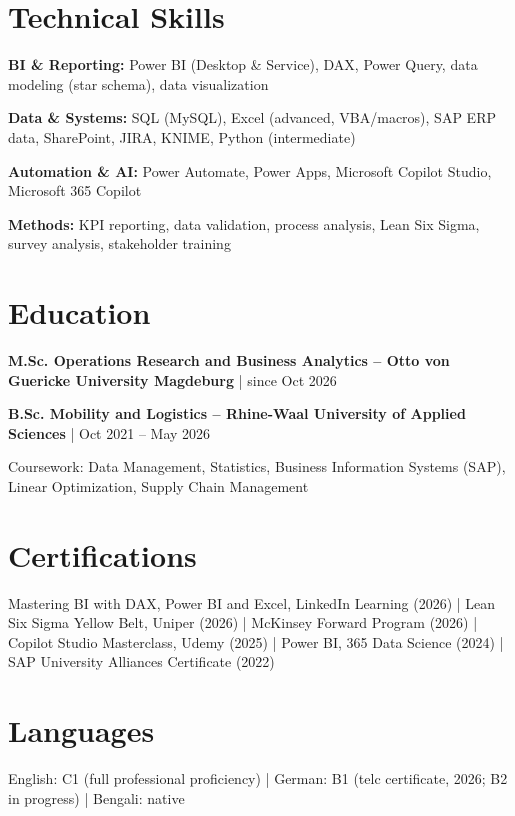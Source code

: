 \documentclass[10pt,a4paper]{article}
\newcommand{\entry}[2]{%
  \vspace{0.22em}%
  {\bfseries #1} | {\color{muted}#2}\par}
\newcommand{\skill}[2]{{\bfseries #1:} #2\par\vspace{0.12em}}
\begin{document}
\section{Technical Skills}
\skill{BI \& Reporting}{Power BI (Desktop \& Service), DAX, Power Query, data modeling (star schema), data visualization}
\skill{Data \& Systems}{SQL (MySQL), Excel (advanced, VBA/macros), SAP ERP data, SharePoint, JIRA, KNIME, Python (intermediate)}
\skill{Automation \& AI}{Power Automate, Power Apps, Microsoft Copilot Studio, Microsoft 365 Copilot}
\skill{Methods}{KPI reporting, data validation, process analysis, Lean Six Sigma, survey analysis, stakeholder training}

\section{Education}
\entry{M.Sc. Operations Research and Business Analytics – Otto von Guericke University Magdeburg}{since Oct 2026}
\entry{B.Sc. Mobility and Logistics – Rhine-Waal University of Applied Sciences}{Oct 2021 – May 2026}
{\small Coursework: Data Management, Statistics, Business Information Systems (SAP), Linear Optimization, Supply Chain Management\par}

\section{Certifications}
{\small
Mastering BI with DAX, Power BI and Excel, LinkedIn Learning (2026) | Lean Six Sigma Yellow Belt, Uniper (2026) | McKinsey Forward Program (2026) | Copilot Studio Masterclass, Udemy (2025) | Power BI, 365 Data Science (2024) | SAP University Alliances Certificate (2022)\par}

\section{Languages}
English: C1 (full professional proficiency) | German: B1 (telc certificate, 2026; B2 in progress) | Bengali: native
\end{document}

